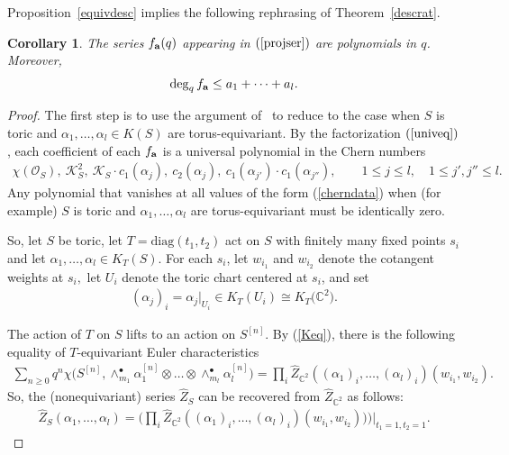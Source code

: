\documentclass[10pt,a4paper]{amsart}
\newtheorem{Corollary}[Theorem]{Corollary}
\numberwithin{equation}{section}
\newcommand{\diag}{\mathrm{diag}}
\def\C{\mathbb C}
\begin{document}
Proposition~\ref{equivdesc} implies the following rephrasing of Theorem~\ref{descrat}.

\begin{Corollary}\label{projdesc}
The series $f_{{\bf a}}(q)$ appearing in $(\ref{projser})$ are polynomials in $q$. Moreover,
\begin{gather*}
\deg_q f_{{\bf a}} \leq a_1+\dots+a_l.
\end{gather*}
\end{Corollary}

\begin{proof}
The first step is to use the argument of~\cite[Sections~4 and~5]{EGL} to reduce to the case when $S$ is toric and $\alpha_1,\dots,\alpha_l\in K(S)$ are torus-equivariant. By the factorization $(\ref{univeq})$, each coefficient of each $f_{\bf a}$ is a universal polynomial in the Chern numbers \begin{align}\label{cherndata}
\chi(\mathcal{O}_{S}),\ \mathcal{K}_{S}^2,\ \mathcal{K}_{S}\cdot c_1(\alpha_j),\ c_2(\alpha_j),\ c_1(\alpha_{j'})\cdot c_1(\alpha_{j''}),\qquad
1\leq j \leq l,\quad 1\leq j',j''\leq l.
\end{align}
Any polynomial that vanishes at all values of the form (\ref{cherndata}) when (for example) $S$ is toric and $\alpha_1,\dots,\alpha_l$ are torus-equivariant must be identically zero.

So, let $S$ be toric, let $T=\diag(t_1,t_2)$ act on $S$ with finitely many fixed points $s_i$ and let $\alpha_1,\dots,\alpha_l\in K_T(S)$. For each $s_i$, let $w_{i_1}$ and $w_{i_2}$ denote the cotangent weights at $s_i,$ let $U_i$ denote the toric chart centered at $s_i$, and set
\begin{gather*}
(\alpha_j)_i=\alpha_j|_{U_i}\in K_T(U_i)\cong K_T\big(\C^2\big).
\end{gather*}

The action of $T$ on $S$ lifts to an action on $S^{[n]}$. By (\ref{Keq}), there is the following equality of $T$-equivariant Euler characteristics
\begin{align*}
\sum_{n\geq 0} q^{n} \chi\big(S^{[n]}, \wedge^{\bullet}_{m_1} \alpha_1^{[n]} \otimes \dots \otimes \wedge^{\bullet}_{m_l} \alpha_l^{[n]} \big)=\prod_{i} \hat{Z}_{\C^2}((\alpha_1)_i,\dots,(\alpha_l)_i)(w_{i_1},w_{i_2}).
\end{align*}
So, the (nonequivariant) series $\hat{Z}_{S}$ can be recovered from $\hat{Z}_{\C^2}$ as follows: \begin{align}\label{toricfact}
\hat{Z}_{S}(\alpha_1,\dots,\alpha_l)=\bigg(\prod_{i} \hat{Z}_{\C^2}((\alpha_1)_i,\dots,(\alpha_l)_i)(w_{i_1},w_{i_2})) \bigg)\bigg|_{t_1=1,t_2=1}.
\end{align}


\end{proof}
\end{document}

